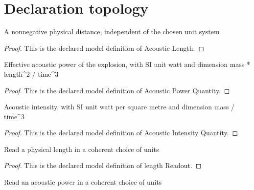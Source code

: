 \section{Declaration topology}
\begin{definition}
  \label{def:physics:phyx-mini-0216:phyxminiproblems-problemphyxmini0216-acousticlength}
  A nonnegative physical distance, independent of the chosen unit system
\end{definition}
\begin{proof}
  This is the declared model definition of Acoustic Length.
\end{proof}
\begin{definition}
  \label{def:physics:phyx-mini-0216:phyxminiproblems-problemphyxmini0216-acousticpowerquantity}
  Effective acoustic power of the explosion, with SI unit watt and dimension mass * length\textasciicircum{}2 / time\textasciicircum{}3
\end{definition}
\begin{proof}
  This is the declared model definition of Acoustic Power Quantity.
\end{proof}
\begin{definition}
  \label{def:physics:phyx-mini-0216:phyxminiproblems-problemphyxmini0216-acousticintensityquantity}
  Acoustic intensity, with SI unit watt per square metre and dimension mass / time\textasciicircum{}3
\end{definition}
\begin{proof}
  This is the declared model definition of Acoustic Intensity Quantity.
\end{proof}
\begin{definition}
  \label{def:physics:phyx-mini-0216:phyxminiproblems-problemphyxmini0216-lengthreadout}
  Read a physical length in a coherent choice of units
\end{definition}
\begin{proof}
  This is the declared model definition of length Readout.
\end{proof}
\begin{definition}
  \label{def:physics:phyx-mini-0216:phyxminiproblems-problemphyxmini0216-acousticpowerreadout}
  Read an acoustic power in a coherent choice of units
\end{definition}
